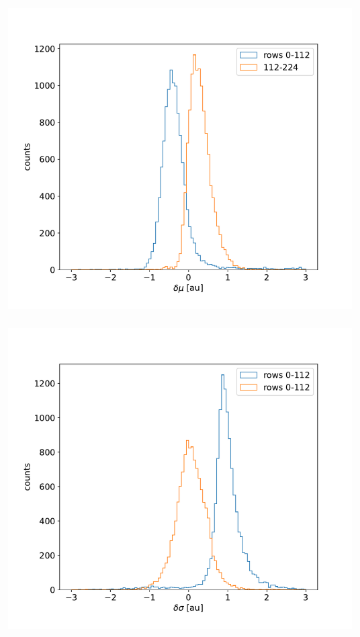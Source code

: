        \begin{figure}
            \centering
            \begin{subfigure}[b]{0.49\textwidth}
                \centering
                \includegraphics[width=\linewidth]{figures/charaterization/deltam_Fe.pdf}
                \caption{}
                \label{fig:delta_m}
            \end{subfigure}
            \hfill
            \begin{subfigure}[b]{0.49\textwidth}
                \centering
                \includegraphics[width=\linewidth]{figures/charaterization/deltas_Fe.pdf}      

\end{subfigure}
\end{figure}
